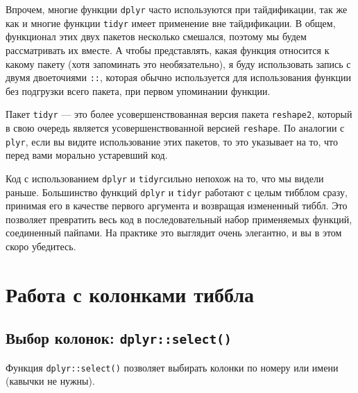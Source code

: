 \documentclass[
]{book}
\newenvironment{Shaded}{\begin{snugshade}}{\end{snugshade}}
\newcommand{\DecValTok}[1]{\textcolor[rgb]{0.00,0.00,0.81}{#1}}
\newcommand{\KeywordTok}[1]{\textcolor[rgb]{0.13,0.29,0.53}{\textbf{#1}}}
\newcommand{\NormalTok}[1]{#1}
\newcommand{\OperatorTok}[1]{\textcolor[rgb]{0.81,0.36,0.00}{\textbf{#1}}}
\newcommand{\StringTok}[1]{\textcolor[rgb]{0.31,0.60,0.02}{#1}}
\begin{document}
Впрочем, многие функции \texttt{dplyr} часто используются при тайдификации, так же как и многие функции \texttt{tidyr} имеет применение вне тайдификации. В общем, функционал этих двух пакетов несколько смешался, поэтому мы будем рассматривать их вместе. А чтобы представлять, какая функция относится к какому пакету (хотя запоминать это необязательно), я буду использовать запись с двумя двоеточиями \texttt{::}, которая обычно используется для использования функции без подгрузки всего пакета, при первом упоминании функции.

Пакет \texttt{tidyr} --- это более усовершенствованная версия пакета \texttt{reshape2}, который в свою очередь является усовершенствованной версией \texttt{reshape}. По аналогии с \texttt{plyr}, если вы видите использование этих пакетов, то это указывает на то, что перед вами морально устаревший код.

Код с использованием \texttt{dplyr} и \texttt{tidyr}сильно непохож на то, что мы видели раньше. Большинство функций \texttt{dplyr} и \texttt{tidyr} работают с целым тибблом сразу, принимая его в качестве первого аргумента и возвращая измененный тиббл. Это позволяет превратить весь код в последовательный набор применяемых функций, соединенный пайпами. На практике это выглядит очень элегантно, и вы в этом скоро убедитесь.

\hypertarget{tidy_select_cols}{%
\section{Работа с колонками тиббла}\label{tidy_select_cols}}

\hypertarget{ux432ux44bux431ux43eux440-ux43aux43eux43bux43eux43dux43eux43a-dplyrselect}{%
\subsection{\texorpdfstring{Выбор колонок: \texttt{dplyr::select()}}{Выбор колонок: dplyr::select()}}\label{ux432ux44bux431ux43eux440-ux43aux43eux43bux43eux43dux43eux43a-dplyrselect}}

Функция \texttt{dplyr::select()} позволяет выбирать колонки по номеру или имени (кавычки не нужны).

\begin{Shaded}
\end{Shaded}
\end{document}
